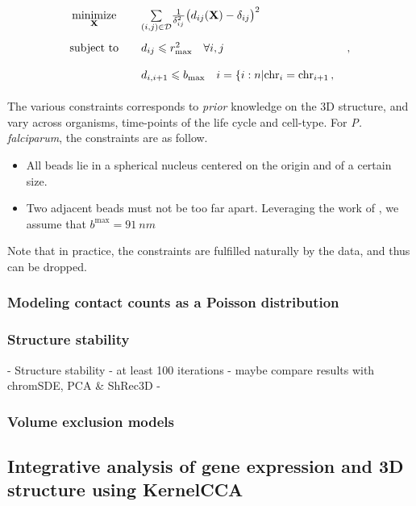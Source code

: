 \documentclass[oupdraft]{bio}
\begin{document}
\begin{equation}\label{eq:mds1} 
\renewcommand{\arraystretch}{2} 
\begin{array}{ccll} 
\underset{\mathbf{X}}{\text{minimize}} & & 
\underset{(i,j) \in \mathcal{D}}{\sum} \frac{1}{\delta^2_{ij}}
\big(d_{ij}(\mathbf{X}) - \delta_{ij}\big)^2 & \\
\text{subject to} & & d_{ij} \leq r^2_\text{max} \quad \forall i, j &\,,\\
& & d_{i, i+1} \leq b_\text{max} \quad i = \{i:n|\text{chr}_i = \text{chr}_{i+1}\,,&\\ 
\end{array} 
\end{equation}

The various constraints corresponds to {\em prior} knowledge on the 3D
structure, and vary across organisms, time-points of the life cycle and
cell-type. For {\em P. falciparum}, the constraints are as follow.

\begin{itemize}
\item All beads lie in a spherical nucleus centered on the origin and of a
certain size.
\item Two adjacent beads must not be too far apart. Leveraging the work of
\citet{berger}, we assume that $b^\text{max} = 91~nm$
\end{itemize}

Note that in practice, the constraints are fulfilled naturally by the data,
and thus can be dropped.  

\subsubsection{Modeling contact counts as a Poisson distribution}



\subsubsection{Structure stability}
- Structure stability
- at least 100 iterations
- maybe compare results with chromSDE, PCA \& ShRec3D 
- 

\subsubsection{Volume exclusion models}


\subsection{Integrative analysis of gene expression and 3D structure using KernelCCA}
\end{document}
